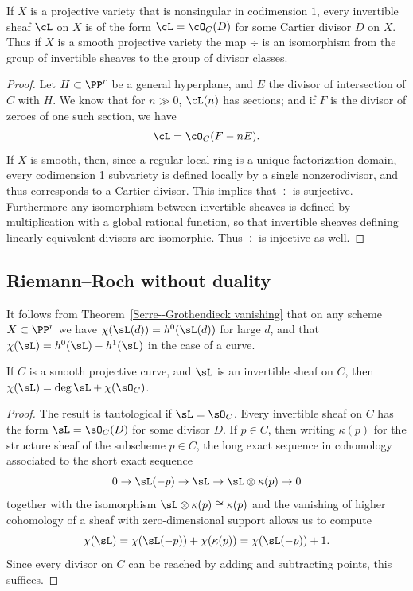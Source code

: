 \begin{corollary}\label{invertible sheaves and divisors}
If $X$ is a projective variety that is nonsingular in codimension $1$,
every invertible sheaf $\cL$ on $X$ is of the form $\cL =\cO_C(D)$ for some 
%
Cartier divisor $D$ on $X$. Thus if $X$ is a smooth projective variety
%
the map $\div$ is an isomorphism from the group of invertible sheaves
to the group 
of divisor classes.
\unif
\end{corollary}

\begin{proof}
Let $H \subset \PP^r$ be a general hyperplane, and $E$  the divisor  of intersection of $C$ with $H$. We know that for $n \gg 0$, $\cL(n)$ has sections; and if $F$ is the divisor of zeroes of one such section, we have
$$
\cL = \cO_C(F - nE).
$$
If $X$ is smooth, then, since a regular local ring is a unique
factorization domain, every codimension 1 subvariety is defined locally 
by a single nonzerodivisor, and thus corresponds to a Cartier divisor.
This implies that $\div$ is surjective. Furthermore any 
isomorphism between invertible sheaves
%
is defined by multiplication with a global rational function, so that invertible sheaves defining linearly equivalent divisors are
isomorphic. Thus $\div$ is injective as well.
\end{proof}

\subsection*{Riemann--Roch without duality}

It follows from Theorem~\ref{Serre--Grothendieck vanishing} that on
any scheme $X\subset \PP^r$ we have $\chi(\sL(d)) = h^0(\sL(d))$ for
large $d$, 
and that $\chi(\sL) = h^0(\sL) - h^1(\sL)$ in the case of a curve.

\begin{theorem}\label{easy RR}
If $C$ is a smooth projective curve, and $\sL$ is an invertible sheaf on $C$, then $\chi(\sL) = \deg \sL + \chi(\sO_C)$.
%
\unif
\end{theorem}

\begin{proof}
 The result is tautological if $\sL = \sO_C$. Every invertible sheaf on $C$ has the form $\sL = \sO_C(D)$ for some
divisor $D$. If $p\in C$, then writing $\kappa(p)$ for the
structure sheaf of the subscheme $p\in C$, the long exact sequence in cohomology
associated to the short exact sequence
$$
0\to \sL(-p) \to \sL \to \sL\otimes \kappa(p)\to 0
$$
together with the isomorphism $\sL\otimes \kappa(p) \cong \kappa(p)$
and the vanishing of higher cohomology of a sheaf with zero-dimensional support allows us to compute 
$$
\chi(\sL) = \chi(\sL(-p)) + \chi(\kappa(p)) = \chi(\sL(-p)) + 1.
$$
Since every divisor on $C$ can be reached by adding and subtracting points, this suffices.
\end{proof}

